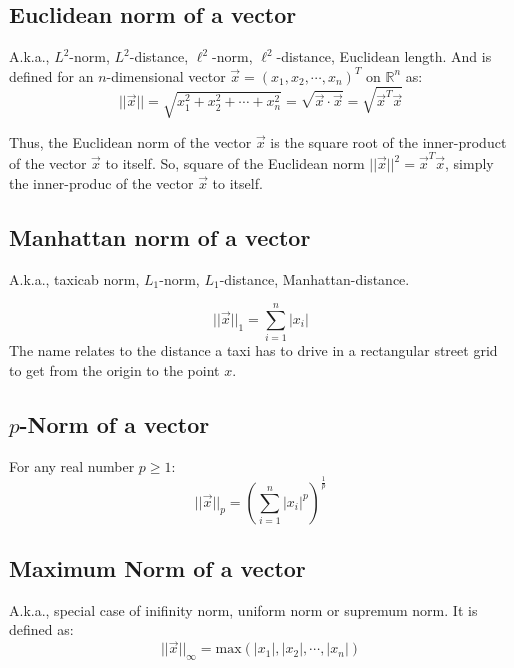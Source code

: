 \documentclass[conference,final,11pt,technote,onecolumn]{IEEEtran}\usepackage[]{graphicx}\usepackage[]{color}
\begin{document}
\subsection{Euclidean norm of a vector}
\label{term:euclidean_norm}
A.k.a., $L^2$-norm, $L^2$-distance, $\ell^2$-norm, $\ell^2$-distance, Euclidean length. And is defined for an $n$-dimensional vector $\vec x = (x_1,x_2,\cdots, x_n)^T$ on $\mathbb{R}^n$ as:
\[
||\vec x|| = \sqrt{x^2_1+x^2_2+\cdots+x^2_n} = \sqrt{\vec x \cdot \vec x} = \sqrt{\vec x^T \vec x}
\]

Thus, the Euclidean norm of the vector $\vec x$ is the square root of the inner-product of the vector $\vec x$ to itself. So, square of the Euclidean norm $||\vec x||^2 = \vec x^T\vec x$, simply the inner-produc of the vector $\vec x$ to itself.

\subsection{Manhattan norm of a vector}
\label{term:manhattan_norm}
A.k.a., taxicab norm, $L_1$-norm, $L_1$-distance, Manhattan-distance. 

\[ ||\vec x||_1 = \sum_{i=1}^n|x_i|\]
The name relates to the distance a taxi has to drive in a rectangular street grid to get from the origin to the point $x$.


\subsection{$p$-Norm of a vector}
\label{term:p-norm}
For any real number $p\ge 1$:
\begin{equation}
\nonumber ||\vec x||_p = \left( \sum_{i=1}^n|x_i|^p\right)^{\frac{1}{p}}
\end{equation}

\subsection{Maximum Norm of a vector}
\label{term:maximum_norm}
A.k.a., special case of inifinity norm, uniform norm or supremum norm. It is defined as:
\begin{equation}
\nonumber ||\vec x||_\infty = \text{max}\left( |x_1|, |x_2|, \cdots, |x_n|\right)
\end{equation}
\end{document}
